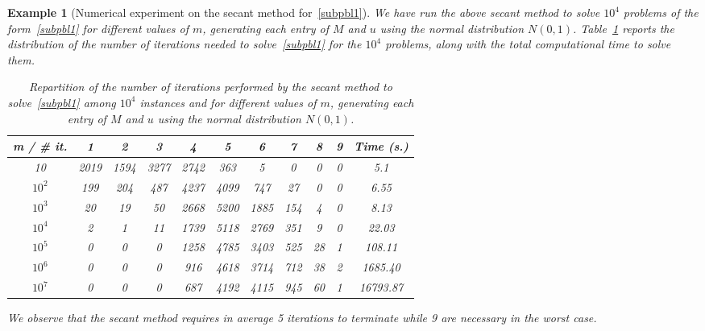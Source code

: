 \documentclass[a4paper,11pt]{article}
\newtheorem{example}{Example}
\numberwithin{equation}{section}
\begin{document}
\begin{example}[Numerical experiment on the secant method for~\eqref{subpbl1}] \label{ex2}
We have run the above secant method to solve  $10^4$ problems of the form~\eqref{subpbl1} for different values of $m$, generating each entry of $M$ and $u$ using the normal distribution $N(0,1)$. 
Table~\ref{tableGauss} reports the distribution of the number of iterations needed to solve~\eqref{subpbl1} for the $10^4$ problems, 
along with the total computational time to solve them.  
\begin{center}
 \begin{table}[ht!]
 \begin{center}
\caption{ 
Repartition of the number of iterations performed by the secant method to solve~\eqref{subpbl1} among $10^4$ instances and for different values of $m$, generating each entry of $M$ and $u$ using the normal distribution $N(0,1)$. 
\label{tableGauss}
}
 \begin{tabular}{|c||c|c|c|c|c|c|c|c|c||c|}
 \hline 
m / \# it. &  1   & 2 & 3 &   4 & 5 & 6 & 7 & 8 & 9 &  Time (s.)  \\
 \hline
 10   & 2019  & 1594  & 3277  & 2742  & 363  &  5  &  0  &  0  &  0  &  5.1  \\
  $10^2$   & 199  & 204  & 487  & 4237  & 4099  & 747  &  27  &  0  &  0  &  6.55  \\
   $10^3$   &  20  &  19  &  50  & 2668  & 5200  & 1885  & 154  &  4  &  0  &  8.13  \\
    $10^4$   &  2  &  1  &  11  & 1739  & 5118  & 2769  & 351  &  9  &  0  &  22.03  \\
   $10^5$   &  0  &  0  &  0  & 1258  & 4785  & 3403  & 525  &  28  &  1  &  108.11  \\
  $10^6$ &  0  &  0  &  0  & 916  & 4618  & 3714  & 712  &  38  &  2  &  1685.40  \\ 
  $10^7$   &  0  &  0  &  0  & 687  & 4192  & 4115  & 945  &  60  &  1  &  16793.87  \\ \hline 
	\end{tabular}
 \end{center}
 \end{table}
 \end{center} 
We observe that the secant method requires in average 5 iterations to terminate while 9 are necessary in the worst case.  

\end{example}
\end{document}
